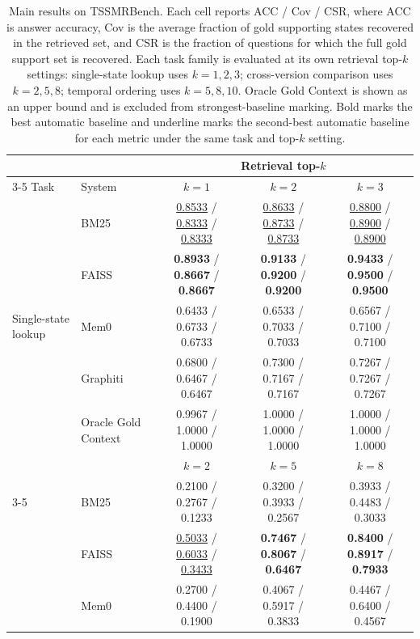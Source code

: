 \begin{table}[t]
\centering
\small
\caption{Main results on TSSMRBench. Each cell reports ACC / Cov / CSR, where ACC is answer accuracy, Cov is the average fraction of gold supporting states recovered in the retrieved set, and CSR is the fraction of questions for which the full gold support set is recovered. Each task family is evaluated at its own retrieval top-$k$ settings: single-state lookup uses $k{=}1,2,3$; cross-version comparison uses $k{=}2,5,8$; temporal ordering uses $k{=}5,8,10$. Oracle Gold Context is shown as an upper bound and is excluded from strongest-baseline marking. Bold marks the best automatic baseline and underline marks the second-best automatic baseline for each metric under the same task and top-$k$ setting.}
\label{tab:overall-expanded}
\setlength{\tabcolsep}{4pt}
\begin{tabular*}{\textwidth}{@{\extracolsep{\fill}}llccc@{}}
\toprule
 & & \multicolumn{3}{c}{Retrieval top-$k$} \\
\cmidrule(lr){3-5}
Task & System & $k{=}1$ & $k{=}2$ & $k{=}3$ \\
\midrule
\multirow{5}{*}{Single-state lookup}
 & BM25 & \underline{0.8533} / \underline{0.8333} / \underline{0.8333} & \underline{0.8633} / \underline{0.8733} / \underline{0.8733} & \underline{0.8800} / \underline{0.8900} / \underline{0.8900} \\
 & FAISS & \textbf{0.8933} / \textbf{0.8667} / \textbf{0.8667} & \textbf{0.9133} / \textbf{0.9200} / \textbf{0.9200} & \textbf{0.9433} / \textbf{0.9500} / \textbf{0.9500} \\
 & Mem0 & 0.6433 / 0.6733 / 0.6733 & 0.6533 / 0.7033 / 0.7033 & 0.6567 / 0.7100 / 0.7100 \\
 & Graphiti & 0.6800 / 0.6467 / 0.6467 & 0.7300 / 0.7167 / 0.7167 & 0.7267 / 0.7267 / 0.7267 \\
 & Oracle Gold Context & 0.9967 / 1.0000 / 1.0000 & 1.0000 / 1.0000 / 1.0000 & 1.0000 / 1.0000 / 1.0000 \\
\midrule
 & & $k{=}2$ & $k{=}5$ & $k{=}8$ \\
\cmidrule(lr){3-5}
\multirow{5}{*}{Cross-version comparison}
 & BM25 & 0.2100 / 0.2767 / 0.1233 & 0.3200 / 0.3933 / 0.2567 & 0.3933 / 0.4483 / 0.3033 \\
 & FAISS & \underline{0.5033} / \underline{0.6033} / \underline{0.3433} & \textbf{0.7467} / \textbf{0.8067} / \textbf{0.6467} & \textbf{0.8400} / \textbf{0.8917} / \textbf{0.7933} \\
 & Mem0 & 0.2700 / 0.4400 / 0.1900 & 0.4067 / 0.5917 / 0.3833 & 0.4467 / 0.6400 / 0.4567 \\

\end{tabular*}
\end{table}

